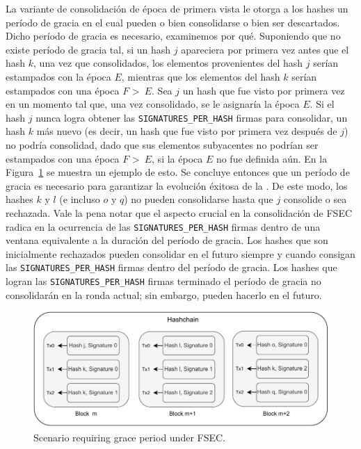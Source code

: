 La variante de consolidación de época de primera vista le otorga a los hashes un período
de gracia en el cual pueden o bien consolidarse o bien ser descartados.
%
Dicho período de gracia es necesario, examinemos por qué.
Suponiendo que no existe período de gracia tal, si un hash $j$ apareciera por primera vez
antes que el hash $k$, una vez que consolidados, los elementos provenientes del hash $j$
serían estampados con la época $E$, mientras que los elementos del hash $k$ serían estampados
con una época $F$ \textgreater \ $E$.
%
Sea $j$ un hash que fue visto por primera vez en un momento tal que, una vez consolidado,
se le asignaría la época $E$.
%
Si el hash $j$ nunca logra obtener las \texttt{SIGNATURES\_PER\_HASH} firmas para
consolidar, un hash $k$ más nuevo (es decir, un hash que fue visto por primera vez
después de $j$) no podría consolidad, dado que sus elementos subyacentes no podrían ser
estampados con una época $F$ \textgreater \ $E$, si la época $E$ no fue definida aún.
%
En la Figura~\ref{fig:grace_period} se muestra un ejemplo de esto.
%
Se concluye entonces que un período de gracia es necesario para garantizar la evolución
éxitosa de la \hashchain. De este modo, los hashes $k$ y $l$ (e incluso $o$ y $q$) no
pueden consolidarse hasta que $j$ consolide o sea rechazada.
%
Vale la pena notar que el aspecto crucial en la consolidación de FSEC radica en la ocurrencia
de las \texttt{SIGNATURES\_PER\_HASH} firmas dentro de una ventana equivalente a la duración
del período de gracia.
%
Los hashes que son inicialmente rechazados pueden consolidar en el futuro siempre y cuando
consigan las \texttt{SIGNATURES\_PER\_HASH} firmas dentro del período de gracia.
%
Los hashes que logran las \texttt{SIGNATURES\_PER\_HASH} firmas terminado el período de gracia
no consolidarán en la ronda actual; sin embargo, pueden hacerlo en el futuro.

\begin{figure}
  \centering
  \includegraphics[scale=0.5]{figures/grace_period.pdf}
  \caption{Scenario requiring grace period under FSEC.}
  \label{fig:grace_period}
\end{figure}

